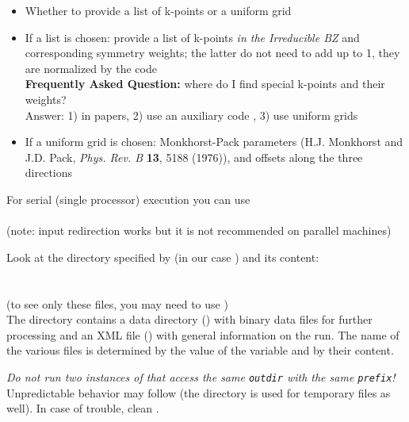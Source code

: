 \documentclass[landscape]{foils}
\begin{document}
\begin{itemize}
\item  Whether to provide a list of k-points or a uniform grid\\

\item  If a list is chosen: provide a list of k-points {\em in the Irreducible
BZ} and corresponding symmetry weights; the latter do not need to add 
up to 1, they are normalized by the code\\[1em]
{\bf Frequently Asked Question:} where do I find special k-points 
and their weights?\\
{\gray Answer: 1) in papers, 2) use an auxiliary code , 
  3) use uniform grids}

\item  If a uniform grid is chosen: Monkhorst-Pack parameters
(H.J. Monkhorst and J.D. Pack, {\sl Phys. Rev. B} {\bf 13}, 5188 (1976)),
and offsets along the three directions
\end{itemize}

For serial (single processor) execution you can use\\[0.5em]
\\[0.5em]
{\small (note: input redirection  works but it
  is not recommended on parallel machines)}

\vspace{-1em}
Look at the directory specified by  (in our case
) and its content:\\[0.5em] 
\\
\\[0.3em]
{\small\gray (to see only these files, you may need to use
)}\\

The directory contains a data directory () with
binary data files for further processing and an XML file
() with general information on the run.  The name of
the various files is determined by the value of the 
variable and by their content.

{\burgundy\em Do not run two instances of  that access the same
  \texttt{outdir} with the same \texttt{prefix}!} Unpredictable
behavior may follow (the directory is used for temporary files as
well).  In case of trouble, clean .
\end{document}
